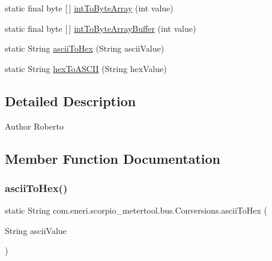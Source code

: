 \begin{DoxyCompactItemize}
\item 
static final byte \mbox{[}$\,$\mbox{]} \hyperlink{classcom_1_1eneri_1_1scorpio__metertool_1_1bus_1_1_conversions_a679d2e78867a3321e25f8fc6b09d6541}{int\+To\+Byte\+Array} (int value)
\item 
static final byte \mbox{[}$\,$\mbox{]} \hyperlink{classcom_1_1eneri_1_1scorpio__metertool_1_1bus_1_1_conversions_a35268a3d933c43a761a4eec22a05a062}{int\+To\+Byte\+Array\+Buffer} (int value)
\item 
static String \hyperlink{classcom_1_1eneri_1_1scorpio__metertool_1_1bus_1_1_conversions_a5081ab5970d0c1dab1f84eb6ad9e06bd}{ascii\+To\+Hex} (String ascii\+Value)
\item 
static String \hyperlink{classcom_1_1eneri_1_1scorpio__metertool_1_1bus_1_1_conversions_a7a69f1c3d0d2bf3216df067c058e4d8c}{hex\+To\+A\+S\+C\+II} (String hex\+Value)
\end{DoxyCompactItemize}


\subsection{Detailed Description}
\begin{DoxyAuthor}{Author}
Roberto 
\end{DoxyAuthor}


\subsection{Member Function Documentation}
\mbox{\label{classcom_1_1eneri_1_1scorpio__metertool_1_1bus_1_1_conversions_a5081ab5970d0c1dab1f84eb6ad9e06bd}} 
\subsubsection{\texorpdfstring{ascii\+To\+Hex()}{asciiToHex()}}
{\footnotesize\ttfamily static String com.\+eneri.\+scorpio\+\_\+metertool.\+bus.\+Conversions.\+ascii\+To\+Hex (\begin{DoxyParamCaption}\item[{String}]{ascii\+Value }\end{DoxyParamCaption})\hspace{0.3cm}{\ttfamily [static]}}

